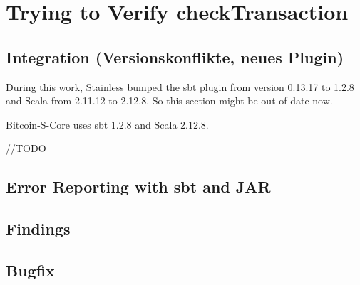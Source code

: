 \chapter{Trying to Verify checkTransaction}
\label{chap:connecting}

\section{Integration (Versionskonflikte, neues Plugin)}
During this work, Stainless bumped the sbt plugin from version 0.13.17 to 1.2.8 and Scala from 2.11.12 to 2.12.8.
So this section might be out of date now.

Bitcoin-S-Core uses sbt 1.2.8 and Scala 2.12.8.

//TODO

\section{Error Reporting with sbt and JAR}


\section{Findings}


\section{Bugfix}

